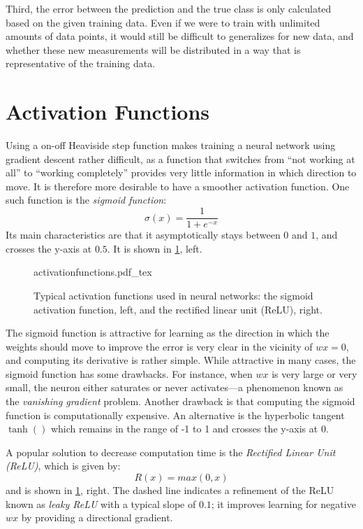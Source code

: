 Third, the error between the prediction and the true class is only calculated based on the given training data. Even if we were to train with unlimited amounts of data points, it would still be difficult to generalizes for new data, and whether these new measurements will be distributed in a way that is representative of the training data.

\section{Activation Functions}\label{sec:activationfunctions}

Using a on-off Heaviside step function makes training a neural network using gradient descent rather difficult, as a function that switches from ``not working at all'' to ``working completely'' provides very little information in which direction to move. It is therefore more desirable to have a smoother activation function. One such function is the \textsl{sigmoid function}:
\begin{equation}
\sigma(x)=\frac{1}{1+e^{-x}}
\end{equation}
Its main characteristics are that it asymptotically stays between $0$ and $1$, and crosses the y-axis at $0.5$. It is shown in \cref{fig:activationfunctions}, left.

\begin{figure}[htb]
    \centering
    \def\svgwidth{0.9\textwidth}
    {activationfunctions.pdf_tex}
    \caption{Typical activation functions used in neural networks: the sigmoid activation function, left, and the rectified linear unit (ReLU), right.\label{fig:activationfunctions}}
\end{figure}

The sigmoid function is attractive for learning as the direction in which the weights should move to improve the error is very clear in the vicinity of $wx=0$, and computing its derivative is rather simple. While attractive in many cases, the sigmoid function has some drawbacks. For instance, when $wx$ is very large or very small, the neuron either saturates or never activates---a phenomenon known as the \textsl{vanishing gradient} problem. Another drawback is that computing the sigmoid function is computationally expensive. An alternative is the hyperbolic tangent $\tanh()$ which remains in the range of -1 to 1 and crosses the y-axis at 0.

A popular solution to decrease computation time is the \textsl{Rectified Linear Unit (ReLU)}, which is given by:
\begin{equation}
R(x)=max(0,x)
\end{equation}
and is shown in \cref{fig:activationfunctions}, right.
The dashed line indicates a refinement of the ReLU known as \textsl{leaky ReLU} with a typical slope of $0.1$; it improves learning for negative $wx$ by providing a directional gradient.

